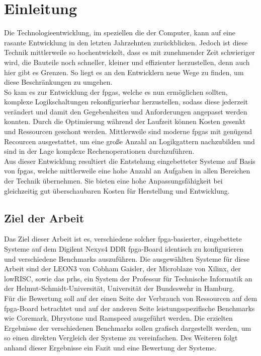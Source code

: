 \chapter{Einleitung}\label{ch:einleitung}

Die Technologieentwicklung, im speziellen die der Computer, kann auf eine rasante Entwicklung in den letzten
Jahrzehnten zurückblicken. Jedoch ist diese Technik mittlerweile so hochentwickelt, dass es mit zunehmender Zeit
schwieriger wird, die Bauteile noch schneller, kleiner und effizienter herzustellen, denn auch hier gibt es Grenzen.
So liegt es an den Entwicklern neue Wege zu finden, um diese Beschränkungen zu umgehen. \\
So kam es zur Entwicklung der \acp{fpga}, welche es nun ermöglichen sollten, komplexe Logikschaltungen
rekonfigurierbar herzustellen, sodass diese jederzeit verändert und damit den Gegebenheiten und
Anforderungen angepasst werden konnten. Durch die Optimierung während der Laufzeit können Kosten gesenkt und
Ressourcen geschont werden. Mittlerweile sind moderne \acp{fpga} mit genügend Recourcen ausgestattet, um eine
große Anzahl an Logikgattern nachzubilden und sind in der Lage komplexe Rechenoperationen durchzuführen.\\
Aus dieser Entwicklung resultiert die Entstehung eingebetteter Systeme auf Basis von \acp{fpga}, welche mittlerweile eine hohe Anzahl an Aufgaben in allen Bereichen der Technik übernehmen.
Sie bieten eine hohe Anpassungsfähigkeit bei gleichzeitig gut überschaubaren Kosten für Herstellung und Entwicklung.\\

\section{Ziel der Arbeit}\label{kap:zielderarbeit}

Das Ziel dieser Arbeit ist es, verschiedene solcher \ac{fpga}-basierter, eingebettete Systeme
auf dem Digilent Nexys4 DDR \ac{fpga}-Board identisch zu konfigurieren und verschiedene Benchmarks auszuführen.
Die ausgewählten Systeme für diese Arbeit sind der LEON3 von Cobham Gaisler, der Microblaze von Xilinx,
der lowRISC, sowie das \ac{prhs}, ein System der
Professur für Technische Informatik an der Helmut-Schmidt-Universität, Universität der Bundeswehr in Hamburg.\\
\newpage
Für die Bewertung soll auf der einen Seite der Verbrauch von Ressourcen auf dem \ac{fpga}-Board betrachtet und
auf der anderen Seite leistungsspezifische Benchmarks
wie Coremark, Dhrystone und Ramspeed ausgeführt werden. Die erzielten Ergebnisse der verschiedenen Benchmarks sollen
grafisch dargestellt werden, um so einen direkten Vergleich der Systeme zu vereinfachen. Des Weiteren folgt anhand
 dieser Ergebnisse ein Fazit und eine
Bewertung der Systeme.\\



